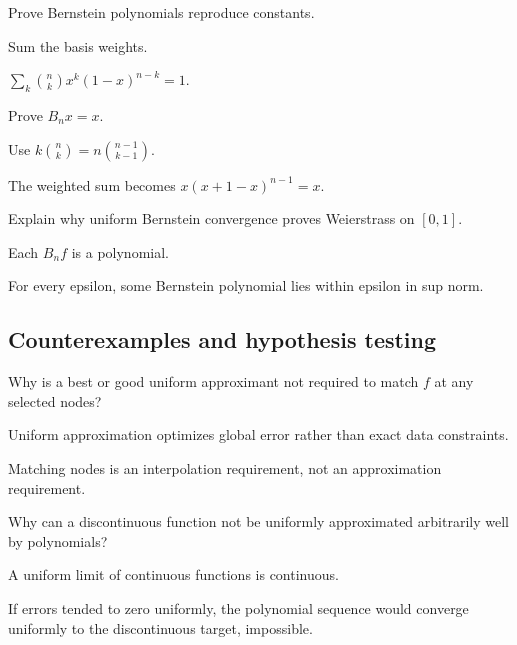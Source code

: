 \begin{exercise}\label{exr:ii21-expand-07}
Prove Bernstein polynomials reproduce constants.
\end{exercise}
\begin{hint}
Sum the basis weights.
\end{hint}
\begin{solution}
\(\sum_k\binom nkx^k(1-x)^{n-k}=1\).
\end{solution}

\begin{exercise}\label{exr:ii21-expand-08}
Prove \(B_nx=x\).
\end{exercise}
\begin{hint}
Use \(k\binom nk=n\binom{n-1}{k-1}\).
\end{hint}
\begin{solution}
The weighted sum becomes \(x(x+1-x)^{n-1}=x\).
\end{solution}

\begin{exercise}\label{exr:ii21-expand-09}
Explain why uniform Bernstein convergence proves Weierstrass on \([0,1]\).
\end{exercise}
\begin{hint}
Each \(B_nf\) is a polynomial.
\end{hint}
\begin{solution}
For every epsilon, some Bernstein polynomial lies within epsilon in sup norm.
\end{solution}

\subsection*{Counterexamples and hypothesis testing}

\begin{exercise}\label{exr:ii21-expand-10}
Why is a best or good uniform approximant not required to match \(f\) at any selected nodes?
\end{exercise}
\begin{hint}
Uniform approximation optimizes global error rather than exact data constraints.
\end{hint}
\begin{solution}
Matching nodes is an interpolation requirement, not an approximation requirement.
\end{solution}

\begin{exercise}\label{exr:ii21-expand-11}
Why can a discontinuous function not be uniformly approximated arbitrarily well by polynomials?
\end{exercise}
\begin{hint}
A uniform limit of continuous functions is continuous.
\end{hint}
\begin{solution}
If errors tended to zero uniformly, the polynomial sequence would converge uniformly to the discontinuous target, impossible.
\end{solution}


